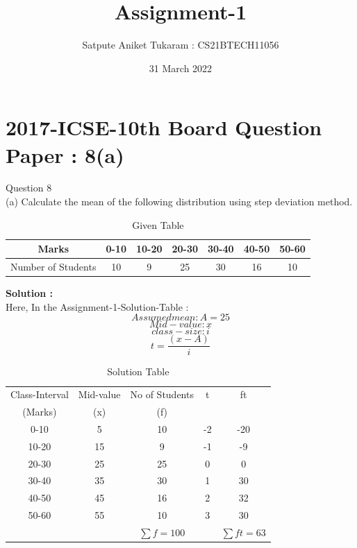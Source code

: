 \documentclass[12pt, a4paper, twocolumn]{article}
\title{Assignment-1}
\author{Satpute Aniket Tukaram : CS21BTECH11056}
\date{31 March 2022}
\begin{document}
\maketitle
\section{2017-ICSE-10th Board Question Paper : 8(a)}
Question 8\\

(a)	Calculate the mean of the following distribution using step deviation method.\\

\begin{table}[h!]
\center
\resizebox{\columnwidth}{!}
{
\begin{tabular}{|c|c|c|c|c|c|c|}
\hline
Marks & 0-10 & 10-20 & 20-30 & 30-40 & 40-50 & 50-60 \\
\hline
Number of Students & 10 & 9 & 25 & 30 & 16 & 10 \\
\hline
\end{tabular}
}
\caption{ Given Table }
\end{table}
\textbf{ Solution : }\\
Here, In the Assignment-1-Solution-Table :\\
\begin{equation*}
Assumed mean : A=25
\end{equation*}
\begin{equation*}
Mid-value : x
\end{equation*}
\begin{equation*}
class-size : i
\end{equation*}
\begin{equation*}
t = \frac{(x-A)}{i}
\end{equation*}
\begin{table}[h!]
\center
\resizebox{\columnwidth}{!}
{
\begin{tabular}{|c|c|c|c|c|}
\hline
Class-Interval & Mid-value & No of Students & t & ft\\
(Marks) & (x) & (f) & & \\
\hline
0-10 & 5 & 10 & -2 & -20 \\
\hline
10-20 & 15 & 9 & -1 & -9\\
\hline
20-30 & 25 & 25 & 0 & 0\\
\hline
30-40 & 35 & 30 & 1 & 30\\
\hline
40-50 & 45 & 16 & 2 & 32\\
\hline
50-60 & 55 & 10 & 3 & 30\\
\hline
 	&		 & 		$ 	\sum f = 100$ 		 &	 &	$ \sum ft = 63$		\\
 \hline
\end{tabular}
}
\caption{ Solution Table  }
\end{table}
\end{document}
